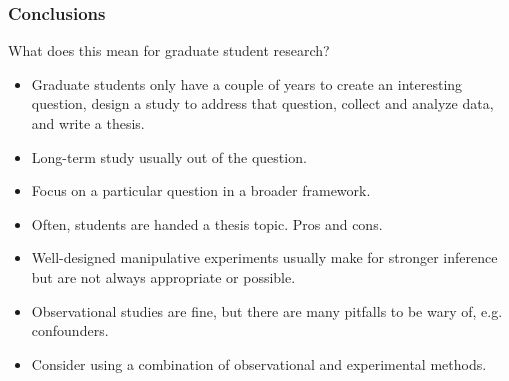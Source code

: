 \documentclass[color=usenames,dvipsnames]{beamer}\usepackage[]{graphicx}\usepackage[]{color}
\begin{document}
\begin{frame}
  \frametitle{Conclusions}
  What does this mean for graduate student research?
  \begin{itemize}[<+->]
    \item Graduate students only have a couple of years to create an
      interesting question, design a study to address that question,
      collect and analyze data, and write a thesis.
    \item Long-term study usually out of the question.
    \item Focus on a particular question in a broader framework.
    \item Often, students are handed a thesis topic. Pros and cons.
    \item Well-designed manipulative experiments usually make for
      stronger inference but are not always appropriate or possible. 
    \item Observational studies are fine, but there are many pitfalls
      to be wary of, e.g. confounders.
    \item Consider using a combination of observational and
      experimental methods.
  \end{itemize}
\end{frame}
\end{document}

